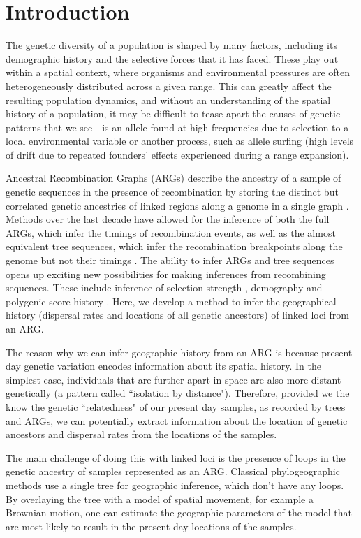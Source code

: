 \section{Introduction}


The genetic diversity of a population is shaped by many factors, including its demographic history and the selective forces that it has faced. These play out within a spatial context, where organisms and environmental pressures are often heterogeneously distributed across a given range. This can greatly affect the resulting population dynamics, and without an understanding of the spatial history of a population, it may be difficult to tease apart the causes of genetic patterns that we see - is an allele found at high frequencies due to selection to a local environmental variable or another process, such as allele surfing (high levels of drift due to repeated founders' effects experienced during a range expansion).

Ancestral Recombination Graphs (ARGs) describe the ancestry of a sample of genetic sequences in the presence of recombination by storing the distinct but correlated genetic ancestries of linked regions along a genome in a single graph \citep{Griffiths1996}. Methods over the last decade have allowed for the inference of both the full ARGs, which infer the timings of recombination events, as well as the almost equivalent tree sequences, which infer the recombination breakpoints along the genome but not their timings \citep{Wong2023}. The ability to infer ARGs and tree sequences opens up exciting new possibilities for making inferences from recombining sequences. These include inference of selection strength \citep{Stern2021}, demography \citep{Guo2022} and polygenic score history \citep{Edge2019}. Here, we develop a method to infer the geographical history (dispersal rates and locations of all genetic ancestors) of linked loci from an ARG. 

The reason why we can infer geographic history from an ARG is because present-day genetic variation  encodes information about its spatial history. In the simplest case, individuals that are further apart in space are also more distant genetically (a pattern called ``isolation by distance"). Therefore, provided we the know the genetic ``relatedness" of our present day samples, as recorded by trees and ARGs, we can potentially extract information about the location of genetic ancestors and dispersal rates from the locations of the samples.

The main challenge of doing this with linked loci is the presence of loops in the genetic ancestry of samples represented as an ARG. Classical phylogeographic methods use a single tree for geographic inference, which don't have any loops. By overlaying the tree with a model of spatial movement, for example a Brownian motion, one can estimate the geographic parameters of the model that are most likely to result in the present day locations of the samples. 

